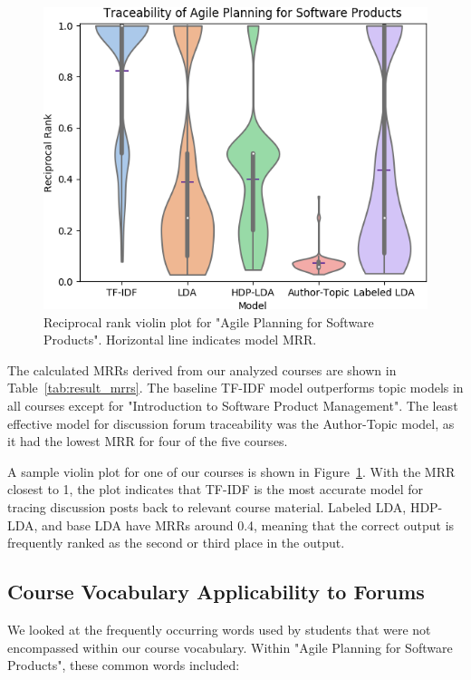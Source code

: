 \documentclass[sigconf, anonymous]{acmart}
\begin{document}
\begin{figure}
    \centering
    \includegraphics[width=\columnwidth]{fig/agile-planning-bootstrap-cropped}
    \caption{Reciprocal rank violin plot for "Agile Planning for Software Products". Horizontal line indicates model MRR.}
    \label{fig:agile-planning-plot}
\end{figure}

The calculated MRRs derived from our analyzed courses are shown in Table~\ref{tab:result_mrrs}.
The baseline TF-IDF model outperforms topic models in all courses except for "Introduction to Software Product Management".
The least effective model for discussion forum traceability was the Author-Topic model, as it had the lowest MRR for four of the five courses.

A sample violin plot for one of our courses is shown in Figure~\ref{fig:agile-planning-plot}. %
With the MRR closest to 1, the plot indicates that TF-IDF is the most accurate model for tracing discussion posts back to relevant course material.
Labeled LDA, HDP-LDA, and base LDA have MRRs around 0.4, meaning that the correct output is frequently ranked as the second or third place in the output.

\subsection{Course Vocabulary Applicability to Forums}
We looked at the frequently occurring words used by students that were not encompassed within our course vocabulary. Within "Agile Planning for Software Products", these common words included:
\end{document}
